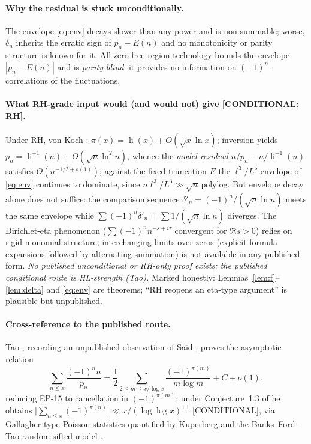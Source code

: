\documentclass[11pt]{article}
\theoremstyle{definition}
\begin{document}
\paragraph{Why the residual is stuck unconditionally.}
The envelope \eqref{eq:env} decays slower than any power and is non-summable; worse, $\delta_n$ inherits the erratic sign of $p_n-E(n)$ and no monotonicity or parity structure is known for it. All zero-free-region technology bounds the envelope $|p_n-E(n)|$ and is \emph{parity-blind}: it provides no information on $(-1)^n$-correlations of the fluctuations.

\paragraph{What RH-grade input would (and would not) give [CONDITIONAL: RH].}
Under RH, von Koch \cite{vK01}: $\pi(x)=\operatorname{li}(x)+O(\sqrt{x}\ln x)$; inversion yields $p_n=\operatorname{li}^{-1}(n)+O(\sqrt n\ln^2n)$, whence the \emph{model residual} $n/p_n-n/\operatorname{li}^{-1}(n)$ satisfies $O(n^{-1/2+o(1)})$; against the fixed truncation $E$ the $\ell^3/L^5$ envelope of \eqref{eq:env} continues to dominate, since $n\ell^3/L^3\gg\sqrt n\,\mathrm{polylog}$. But envelope decay alone does not suffice: the comparison sequence $\delta'_n=(-1)^n/(\sqrt n\ln n)$ meets the same envelope while $\sum(-1)^n\delta'_n=\sum1/(\sqrt n\ln n)$ diverges. The Dirichlet-eta phenomenon ($\sum(-1)^nn^{-s+i\tau}$ convergent for $\Re s>0$) relies on rigid monomial structure; interchanging limits over zeros (explicit-formula expansions followed by alternating summation) is not available in any published form. \emph{No published unconditional or RH-only proof exists; the published conditional route is HL-strength (Tao).} Marked honestly: Lemmas~\ref{lem:f}--\ref{lem:delta} and \eqref{eq:env} are theorems; ``RH reopens an eta-type argument'' is plausible-but-unpublished.

\paragraph{Cross-reference to the published route.}
Tao \cite{Ta23}, recording an unpublished observation of Said \cite{MO}, proves the asymptotic relation
\begin{equation}\label{eq:said}
\sum_{n\le x}\frac{(-1)^nn}{p_n}=\frac12\sum_{2\le m\le x/\log x}\frac{(-1)^{\pi(m)}}{m\log m}+C+o(1),
\end{equation}
reducing EP-15 to cancellation in $(-1)^{\pi(m)}$; under Conjecture~1.3 of \cite{Ta23} he obtains $\bigl|\sum_{n\le x}(-1)^{\pi(n)}\bigr|\ll x/(\log\log x)^{1.1}$ [CONDITIONAL], via Gallagher-type Poisson statistics \cite{Ga76} quantified by Kuperberg \cite{Ku} and the Banks--Ford--Tao random sifted model \cite{BFT}.
\end{document}
